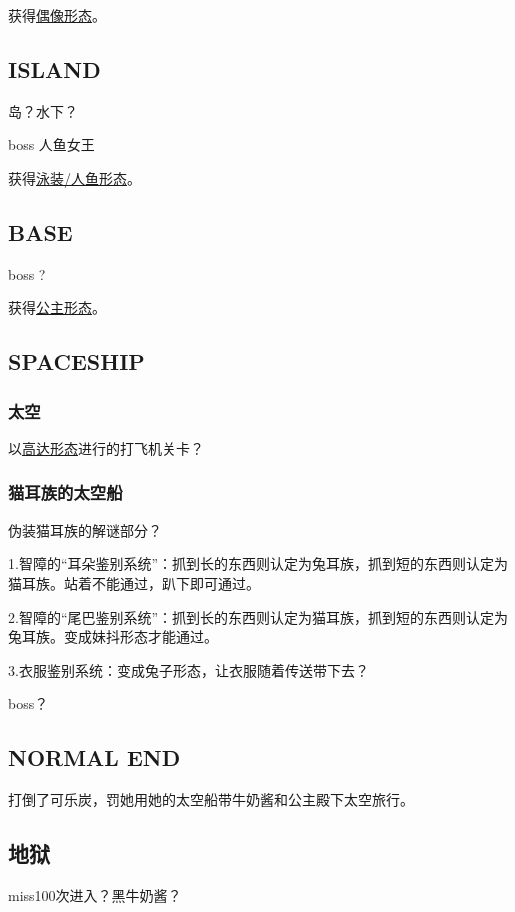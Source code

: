 \documentclass{article}
\begin{document}
获得\hyperref[costume_idol]{偶像形态}。

\subsection{ISLAND}

岛？水下？

boss 人鱼女王

获得\hyperref[costume_mermaid]{泳装/人鱼形态}。

\subsection{BASE}

boss ?

获得\hyperref[costume_hime]{公主形态}。

\subsection{SPACESHIP}

\subsubsection{太空}

以\hyperref[costume_gundam]{高达形态}进行的打飞机关卡？

\subsubsection{猫耳族的太空船}

伪装猫耳族的解谜部分？

1.智障的“耳朵鉴别系统”：抓到长的东西则认定为兔耳族，抓到短的东西则认定为猫耳族。站着不能通过，趴下即可通过。

2.智障的“尾巴鉴别系统”：抓到长的东西则认定为猫耳族，抓到短的东西则认定为兔耳族。变成妹抖形态才能通过。

3.衣服鉴别系统：变成兔子形态，让衣服随着传送带下去？

boss？

\subsection{NORMAL END}

打倒了可乐炭，罚她用她的太空船带牛奶酱和公主殿下太空旅行。

\subsection{地狱}

miss100次进入？黑牛奶酱？
\end{document}
